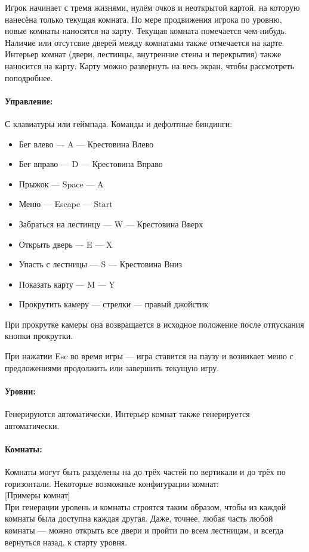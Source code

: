 \documentclass[12pt,a4paper]{article}
\begin{document}
Игрок начинает с тремя жизнями, нулём очков и неоткрытой картой, на которую нанесёна только текущая комната. По мере продвижения игрока по уровню, новые комнаты наносятся на карту. Текущая комната помечается чем-нибудь. Наличие или отсутсвие дверей между комнатами также отмечается на карте. Интерьер комнат (двери, лестинцы, внутренние стены и перекрытия) также наносится на карту. Карту можно развернуть на весь экран, чтобы рассмотреть поподробнее.
\paragraph{Управление:}
С клавиатуры или геймпада.
Команды и дефолтные биндинги:
\begin{itemize}
\item Бег влево --- A --- Крестовина Влево
\item Бег вправо --- D --- Крестовина Вправо
\item Прыжок --- Space --- A
\item Меню --- Escape --- Start
\item Забраться на лестинцу --- W --- Крестовина Вверх
\item Открыть дверь --- E --- X
\item Упасть с лестницы --- S --- Крестовина Вниз
\item Показать карту --- M --- Y
\item Прокрутить камеру --- стрелки --- правый джойстик
\end{itemize}
При прокрутке камеры она возвращается в исходное положение после отпускания кнопки прокрутки.

При нажатии Esc во время игры --- игра ставится на паузу и возникает меню с предложениями продолжить или завершить текущую игру.
\paragraph{Уровни:}
Генерируются автоматически. Интерьер комнат также генерируется автоматически.
\paragraph{Комнаты:}
Комнаты могут быть разделены на до трёх частей по вертикали и до трёх по горизонтали. Некоторые возможные конфигурации комнат:\\

{\color{blue}[Примеры комнат]}\\

При генерации уровень и комнаты строятся таким образом, чтобы из каждой комнаты была доступна каждая другая. Даже, точнее, любая часть любой комнаты --- можно открыть все двери и пройти по всем лестницам, и всегда вернуться назад, к старту уровня.
\end{document}
